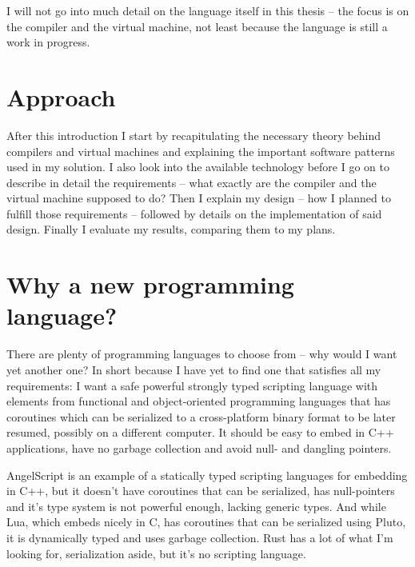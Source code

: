 	I will not go into much detail on the language itself in this thesis -- the focus is on the compiler and the virtual machine, not least because the language is still a work in progress.
    
    
	\section{Approach} %
	
	After this introduction I start by recapitulating the necessary theory behind compilers and virtual machines and explaining the important software patterns used in my solution. I also look into the available technology before I go on to describe in detail the requirements -- what exactly are the compiler and the virtual machine supposed to do? Then I explain my design -- how I planned to fulfill those requirements -- followed by details on the implementation of said design. Finally I evaluate my results, comparing them to my plans.
	
	
	\section{Why a new programming language?}
	
	There are plenty of programming languages to choose from -- why would I want yet another one? In short because I have yet to find one that satisfies all my requirements: I want a safe powerful strongly typed scripting language with elements from functional and object-oriented programming languages that has coroutines which can be serialized to a cross-platform binary format to be later resumed, possibly on a different computer. It should be easy to embed in C++ applications, have no garbage collection and avoid null- and dangling pointers.
	
	AngelScript\cite{angelscript} is an example of a statically typed scripting languages for embedding in C++, but it doesn't have coroutines that can be serialized, has null-pointers and it's type system is not powerful enough, lacking generic types. And while Lua\cite{lua}, which embeds nicely in C, has coroutines that can be serialized using Pluto\cite{pluto}, it is dynamically typed and uses garbage collection. Rust\cite{rust} has a lot of what I'm looking for, serialization aside, but it's no scripting language.
	
